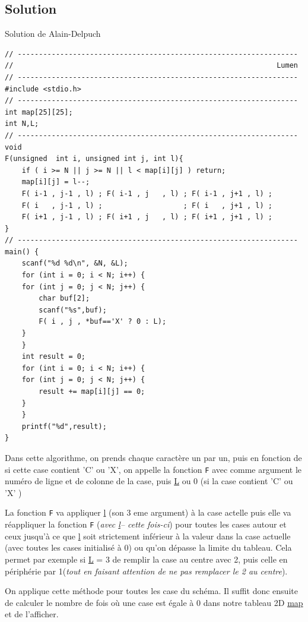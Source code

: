 \documentclass[11pt]{article}
\begin{document}
\subsection{Solution}
\label{sec:org56b5b52}

Solution de Alain-Delpuch 

\begin{verbatim}
// ------------------------------------------------------------------
//                                                              Lumen
// ------------------------------------------------------------------
#include <stdio.h>
// ------------------------------------------------------------------
int map[25][25];
int N,L;
// ------------------------------------------------------------------
void
F(unsigned  int i, unsigned int j, int l){
    if ( i >= N || j >= N || l < map[i][j] ) return;
    map[i][j] = l--;
    F( i-1 , j-1 , l) ; F( i-1 , j   , l) ; F( i-1 , j+1 , l) ; 
    F( i   , j-1 , l) ;                   ; F( i   , j+1 , l) ; 
    F( i+1 , j-1 , l) ; F( i+1 , j   , l) ; F( i+1 , j+1 , l) ; 
}
// ------------------------------------------------------------------
main() {
    scanf("%d %d\n", &N, &L);
    for (int i = 0; i < N; i++) {
	for (int j = 0; j < N; j++) {
	    char buf[2];
	    scanf("%s",buf);
	    F( i , j , *buf=='X' ? 0 : L);
	}
    }
    int result = 0;
    for (int i = 0; i < N; i++) {
	for (int j = 0; j < N; j++) {
	    result += map[i][j] == 0;
	}
    }
    printf("%d",result);
}
\end{verbatim}


Dans cette algorithme, on prends chaque caractère un par un, puis en fonction de si cette case contient 'C' ou 'X', on appelle la fonction \texttt{F} avec comme argument le numéro de ligne et de colonne de la case, puis \uline{L} ou 0 (si la case contient 'C' ou 'X' )

La fonction \texttt{F} va appliquer \uline{l} (son 3 eme argument) à la case actelle puis elle va réappliquer la fonction \texttt{F} (\emph{avec \uline{l}-- cette fois-ci}) pour toutes les cases autour et ceux jusqu'à ce que \uline{l} soit strictement inférieur à la valeur dans la case actuelle (avec toutes les cases initialisé à 0) ou qu'on dépasse la limite du tableau. Cela permet par exemple si \uline{L} = 3 de remplir la case au centre avec 2, puis celle en périphérie par 1(\emph{tout en faisant attention de ne pas remplacer le 2 au centre}).

On applique cette méthode pour toutes les case du schéma. Il suffit donc ensuite de calculer le nombre de fois où une case est égale à 0 dans notre tableau 2D \uline{map} et de l'afficher. 
\end{document}
